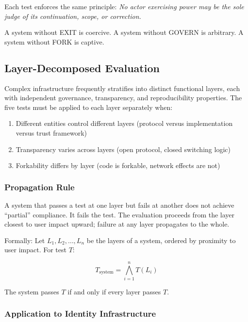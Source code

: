 Each test enforces the same principle: \textit{No actor exercising power may be the sole judge of its continuation, scope, or correction.}

A system without EXIT is coercive. A system without GOVERN is arbitrary. A system without FORK is captive.

\subsection{Layer-Decomposed Evaluation}
\label{subsec:layers}

Complex infrastructure frequently stratifies into distinct functional layers, each with independent governance, transparency, and reproducibility properties. The five tests must be applied to each layer separately when:

\begin{enumerate}[noitemsep,topsep=0pt]
    \item Different entities control different layers (protocol versus implementation versus trust framework)
    \item Transparency varies across layers (open protocol, closed switching logic)
    \item Forkability differs by layer (code is forkable, network effects are not)
\end{enumerate}

\subsubsection{Propagation Rule}

A system that passes a test at one layer but fails at another does not achieve ``partial'' compliance. It fails the test. The evaluation proceeds from the layer closest to user impact upward; failure at any layer propagates to the whole.

Formally: Let $L_1, L_2, \ldots, L_n$ be the layers of a system, ordered by proximity to user impact. For test $T$:

\begin{equation}
T_{\text{system}} = \bigwedge_{i=1}^{n} T(L_i)
\end{equation}

The system passes $T$ if and only if every layer passes $T$.

\subsubsection{Application to Identity Infrastructure}

